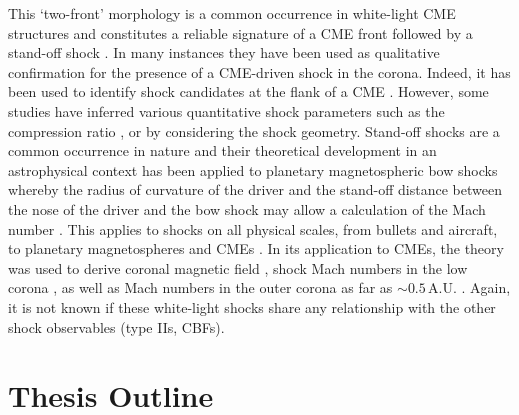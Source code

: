 This `two-front' morphology is a common occurrence in white-light CME structures and constitutes a reliable signature of a CME front followed by a stand-off shock \citep{vourlidas2013}. In many instances they have been used as qualitative confirmation for the presence of a CME-driven shock in the corona. Indeed, it has been used to identify shock candidates at the flank of a CME \citep{vourlidas2003}. However, some studies have inferred various quantitative shock parameters such as the compression ratio \citep{ontiveros2009}, or by considering the shock geometry. Stand-off shocks are a common occurrence in nature and their theoretical development in an astrophysical context has been applied to planetary magnetospheric bow shocks whereby the radius of curvature of the driver and the stand-off distance between the nose of the driver and the bow shock may allow a calculation of the Mach number \citep{spreiter1966}. This applies to shocks on all physical scales, from bullets and aircraft, to planetary magnetospheres and CMEs \citep{russel2002}. In its application to CMEs, the theory was used to derive coronal magnetic field \citep{kim2012}, shock Mach numbers in the low corona \citep{gopal2012}, as well as Mach numbers in the outer corona as far as $\sim0.5\,$A.U. \citep{maloney2011}. Again, it is not known if these white-light shocks share any relationship with the other shock observables (type IIs, CBFs).



\clearpage
\section{Thesis Outline}


